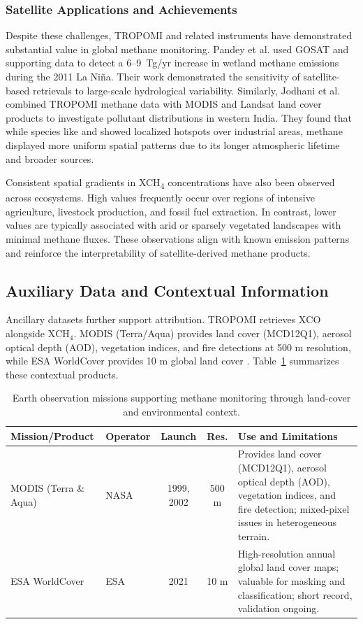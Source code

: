 \subsubsection{Satellite Applications and Achievements}

Despite these challenges, TROPOMI and related instruments have demonstrated substantial value in global methane monitoring. Pandey et al. \cite{Pandey2017} used GOSAT and supporting data to detect a 6--9~Tg/yr increase in wetland methane emissions during the 2011 La Niña. Their work demonstrated the sensitivity of satellite-based retrievals to large-scale hydrological variability. Similarly, Jodhani et al. \cite{Jodhani2024} combined TROPOMI methane data with MODIS and Landsat land cover products to investigate pollutant distributions in western India. They found that while species like  and  showed localized hotspots over industrial areas, methane displayed more uniform spatial patterns due to its longer atmospheric lifetime and broader sources.

Consistent spatial gradients in XCH\textsubscript{4} concentrations have also been observed across ecosystems. High values frequently occur over regions of intensive agriculture, livestock production, and fossil fuel extraction. In contrast, lower values are typically associated with arid or sparsely vegetated landscapes with minimal methane fluxes. These observations align with known emission patterns and reinforce the interpretability of satellite-derived methane products.

\subsection{Auxiliary Data and Contextual Information}

Ancillary datasets further support attribution. TROPOMI retrieves \(\mathrm{XCO}\) alongside \(\mathrm{XCH_4}\). MODIS (Terra/Aqua) provides land cover (MCD12Q1), aerosol optical depth (AOD), vegetation indices, and fire detections at 500 m resolution, while ESA WorldCover provides 10 m global land cover \cite{Karoff2023}. Table~\ref{tab:contextual_products} summarizes these contextual products.

\begin{table}[htbp]
\centering
\caption{Earth observation missions supporting methane monitoring through land-cover and environmental context.}
\label{tab:contextual_products}
\small
\begin{tabularx}{\textwidth}{@{}l l c c X@{}}
\toprule
\textbf{Mission/Product} & \textbf{Operator} & \textbf{Launch} & \textbf{Res.} & \textbf{Use and Limitations} \\
\midrule
MODIS (Terra \& Aqua) & NASA & 1999, 2002 & 500 m & Provides land cover (MCD12Q1), aerosol optical depth (AOD), vegetation indices, and fire detection; mixed-pixel issues in heterogeneous terrain. \\
ESA WorldCover & ESA & 2021 & 10 m & High-resolution annual global land cover maps; valuable for masking and classification; short record, validation ongoing. \\
\bottomrule
\end{tabularx}
\end{table}

